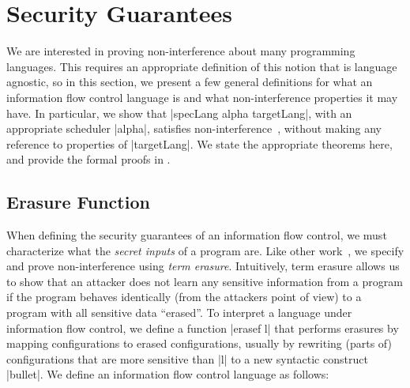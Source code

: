 \section{Security Guarantees}
\label{sec:formal}

We are interested in proving non-interference about many programming
languages.  This requires an appropriate definition of this notion
that is language agnostic, so in this section, we present a few
general definitions for what an information flow control language is
and what non-interference properties it may have.
In particular, we show that |specLang alpha targetLang|, with an appropriate
scheduler |alpha|, satisfies non-interference~\cite{Goguen82},
without making any reference to properties of |targetLang|.
We state the appropriate theorems here, and provide the formal
proofs in
.


\subsection{Erasure Function}

When defining the security guarantees of an information flow control,
we must characterize what the \emph{secret inputs} of a program are.  Like
other work~\cite{Li+:2010:arrows,Russo+:Haskell08,lio,stefan:addressing-covert},
we specify and prove non-interference using \emph{term erasure}.
%
Intuitively, term erasure allows us to show that an attacker does not learn
any sensitive information from a program if the program behaves identically
(from the attackers point of view) to a program with all sensitive data
``erased''.
%
To interpret a language under information flow control, we define a function |erasef l| that
performs erasures by mapping configurations to erased configurations,
usually by rewriting (parts of) configurations that are more sensitive
than |l| to a new syntactic construct |bullet|.  We define
an information flow control language as follows:

